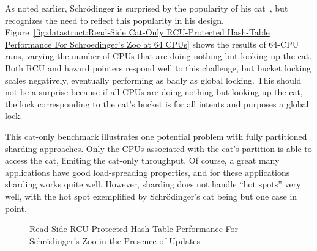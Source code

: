 As noted earlier, Schr\"odinger is surprised by the popularity of his
cat~\cite{ErwinSchroedinger1935Cat}, but recognizes the need to reflect
this popularity in his design.
Figure~\ref{fig:datastruct:Read-Side Cat-Only RCU-Protected Hash-Table Performance For Schroedinger's Zoo at 64 CPUs}
shows the results of 64-CPU runs, varying the number of CPUs that are
doing nothing but looking up the cat.
Both RCU and hazard pointers respond well to this challenge, but bucket
locking scales negatively, eventually performing as badly as global
locking.
This should not be a surprise because if all CPUs are doing nothing
but looking up the cat, the lock corresponding to the cat's bucket
is for all intents and purposes a global lock.

This cat-only benchmark illustrates one potential problem with
fully partitioned sharding approaches.
Only the CPUs associated with the cat's
partition is able to access the cat, limiting the cat-only
throughput.
Of course, a great many applications have good load-spreading
properties, and for these applications sharding works
quite well.
However, sharding does not handle ``hot spots'' very well, with
the hot spot exemplified by Schr\"odinger's cat being but one case
in point.

\begin{figure}[tb]
\centering
{}
\caption{Read-Side RCU-Protected Hash-Table Performance For Schr\"odinger's Zoo in the Presence of Updates}
\label{fig:datastruct:Read-Side RCU-Protected Hash-Table Performance For Schroedinger's Zoo in the Presence of Updates}
\end{figure}


